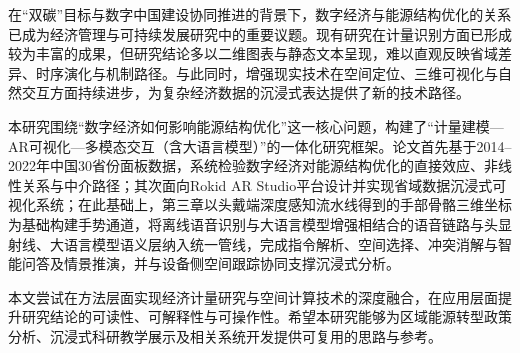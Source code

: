 

在“双碳”目标与数字中国建设协同推进的背景下，数字经济与能源结构优化的关系已成为经济管理与可持续发展研究中的重要议题。现有研究在计量识别方面已形成较为丰富的成果，但研究结论多以二维图表与静态文本呈现，难以直观反映省域差异、时序演化与机制路径。与此同时，增强现实技术在空间定位、三维可视化与自然交互方面持续进步，为复杂经济数据的沉浸式表达提供了新的技术路径。

本研究围绕“数字经济如何影响能源结构优化”这一核心问题，构建了“计量建模—AR可视化—多模态交互（含大语言模型）”的一体化研究框架。论文首先基于2014--2022年中国30省份面板数据，系统检验数字经济对能源结构优化的直接效应、非线性关系与中介路径；其次面向Rokid AR Studio平台设计并实现省域数据沉浸式可视化系统；在此基础上，第三章以头戴端深度感知流水线得到的手部骨骼三维坐标为基础构建手势通道，将离线语音识别与大语言模型增强相结合的语音链路与头显射线、大语言模型语义层纳入统一管线，完成指令解析、空间选择、冲突消解与智能问答及情景推演，并与设备侧空间跟踪协同支撑沉浸式分析。

本文尝试在方法层面实现经济计量研究与空间计算技术的深度融合，在应用层面提升研究结论的可读性、可解释性与可操作性。希望本研究能够为区域能源转型政策分析、沉浸式科研教学展示及相关系统开发提供可复用的思路与参考。